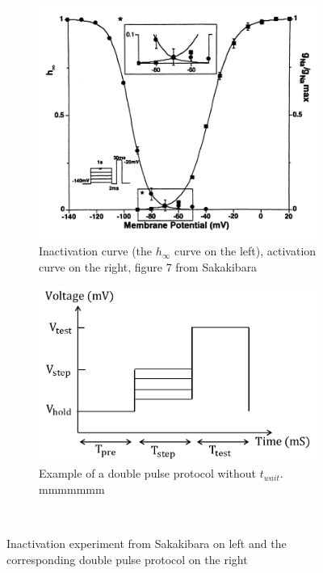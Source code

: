 \documentclass[11pt]{report}
\begin{document}
\begin{figure}[H]
    \centering
    \captionsetup{singlelinecheck = false, format= hang, justification=centerlast, font=footnotesize, labelsep=space}
    \begin{subfigure}[b]{0.49\textwidth}
    \centering
        \includegraphics[width=\linewidth]{figures/InactCurveSaka.png}
        \caption{Inactivation curve (the $h_{\infty}$ curve on the left), activation curve on the right, figure 7 from Sakakibara \cite{Sakakibara1992}}
    \end{subfigure}
    \begin{subfigure}[b]{0.49\textwidth}
    \centering
        \includegraphics[width=\linewidth]{figures/InactVoltageSteps.png}
        \caption{Example of a double pulse protocol without $t_{wait}$. {\color{white} mmmmmmm } }
    \end{subfigure}

    ~
    \caption{Inactivation experiment from Sakakibara \cite{Sakakibara1992} on left and the corresponding double pulse protocol on the right}
    \label{fig:InactCurveSaka}
\end{figure}
\end{document}
